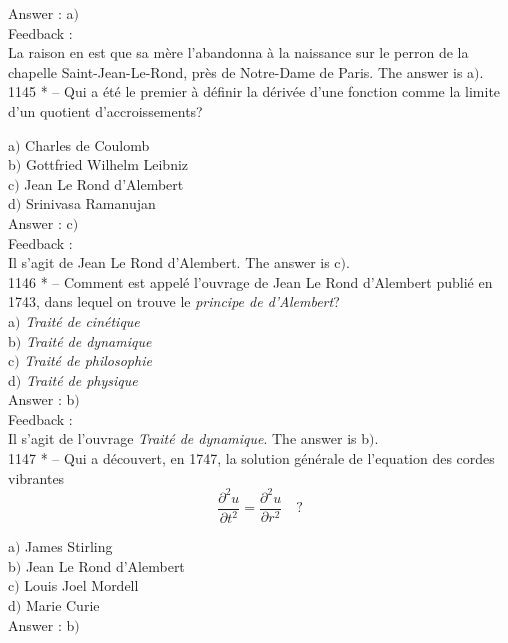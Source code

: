 ﻿\documentclass[letterpaper, 12pt]{article}
\begin{document}
Answer : a$)$\\

Feedback : \\
La raison en est que sa m\`ere l'abandonna \`a la naissance sur le
perron de la chapelle Saint-Jean-Le-Rond, pr\`es de
Notre-Dame de Paris. The answer is a$)$. \\

1145 * -- Qui a \'et\'e le premier \`a d\'efinir la d\'eriv\'ee
d'une fonction comme la limite d'un quotient d'accroissements?

a$)$ Charles de Coulomb \\
b$)$ Gottfried Wilhelm Leibniz \\
c$)$ Jean Le Rond d'Alembert \\
d$)$ Srinivasa Ramanujan  \\

Answer : c$)$\\

Feedback : \\
Il s'agit de Jean Le Rond d'Alembert. The answer is c$)$. \\

1146 * -- Comment est appel\'e l'ouvrage de Jean Le Rond d'Alembert publi\'e
en 1743, dans lequel on trouve
le {\sl principe de d'Alembert}?\\

a$)$ {\sl Trait\'e de cin\'etique}  \\
b$)$ {\sl Trait\'e de dynamique} \\
c$)$ {\sl Trait\'e de philosophie}  \\
d$)$ {\sl Trait\'e de physique}  \\

Answer : b$)$\\

Feedback : \\
Il s'agit de l'ouvrage {\sl Trait\'e de dynamique}. The answer is b$)$.
\\

1147 * -- Qui a d\'ecouvert, en 1747, la solution g\'en\'erale de
l'equation des cordes vibrantes
$$\displaystyle{\frac{\partial^2u}{\partial t^2}=\frac{\partial^2u}{\partial
r^2}}\quad?$$

a$)$ James Stirling \\
b$)$ Jean Le Rond d'Alembert \\
c$)$ Louis Joel Mordell  \\
d$)$ Marie Curie  \\

Answer : b$)$\\
\end{document}
